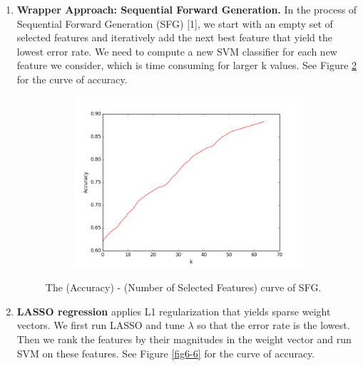 \documentclass{article} %
\begin{document}
\begin{enumerate}
      \item \textbf{Wrapper Approach: Sequential Forward Generation.} 
      In the process of Sequential Forward Generation (SFG) [1], we start with an empty set of selected features and iteratively add the next best feature that yield the lowest error rate. We need to compute a new SVM classifier for each new feature we consider, which is time consuming for larger k values. See Figure \ref{fig5-5} for the curve of accuracy.
          \begin{figure}[H]
          \centering
          \begin{subfigure}{.5\textwidth}
          \centering
          \includegraphics[width=\linewidth]{hillclimb.png}
          \label{fig5}
          \end{subfigure}
          \caption{The (Accuracy) - (Number of Selected Features) curve of SFG.}
          \label{fig5-5}
          \end{figure}
      \item \textbf{LASSO regression} applies L1 regularization that yields sparse weight vectors. We first run LASSO and tune $\lambda$ so that the error rate is the lowest. Then we rank the features by their magnitudes in the weight vector and run SVM on these features. See Figure \ref{fig6-6} for the curve of accuracy.
	      \begin{figure}[H]
          \centering
          \begin{subfigure}{.5\textwidth}
          \centering

\end{subfigure}
\end{figure}
\end{enumerate}
\end{document}
